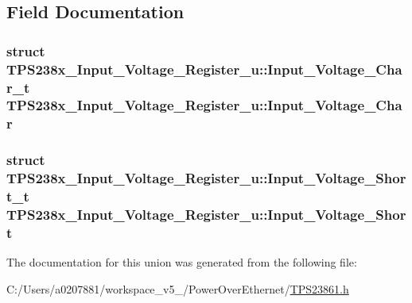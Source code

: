 \subsection{Field Documentation}
\hypertarget{union_t_p_s238x___input___voltage___register__u_a5d2d668d4d56c5fa74cb4ccfe6cd11ea}{
\subsubsection[{Input\-\_\-\-Voltage\-\_\-\-Char}]{\setlength{\rightskip}{0pt plus 5cm}struct {\bf T\-P\-S238x\-\_\-\-Input\-\_\-\-Voltage\-\_\-\-Register\-\_\-u\-::\-Input\-\_\-\-Voltage\-\_\-\-Char\-\_\-t}  T\-P\-S238x\-\_\-\-Input\-\_\-\-Voltage\-\_\-\-Register\-\_\-u\-::\-Input\-\_\-\-Voltage\-\_\-\-Char}}\label{union_t_p_s238x___input___voltage___register__u_a5d2d668d4d56c5fa74cb4ccfe6cd11ea}
\hypertarget{union_t_p_s238x___input___voltage___register__u_a896664df5da66b917948d3eb9fd97243}{
\subsubsection[{Input\-\_\-\-Voltage\-\_\-\-Short}]{\setlength{\rightskip}{0pt plus 5cm}struct {\bf T\-P\-S238x\-\_\-\-Input\-\_\-\-Voltage\-\_\-\-Register\-\_\-u\-::\-Input\-\_\-\-Voltage\-\_\-\-Short\-\_\-t}  T\-P\-S238x\-\_\-\-Input\-\_\-\-Voltage\-\_\-\-Register\-\_\-u\-::\-Input\-\_\-\-Voltage\-\_\-\-Short}}\label{union_t_p_s238x___input___voltage___register__u_a896664df5da66b917948d3eb9fd97243}


The documentation for this union was generated from the following file\-:\begin{DoxyCompactItemize}
\item 
C\-:/\-Users/a0207881/workspace\-\_\-v5\-\_/\-Power\-Over\-Ethernet/\hyperlink{_t_p_s23861_8h}{T\-P\-S23861.\-h}\end{DoxyCompactItemize}
